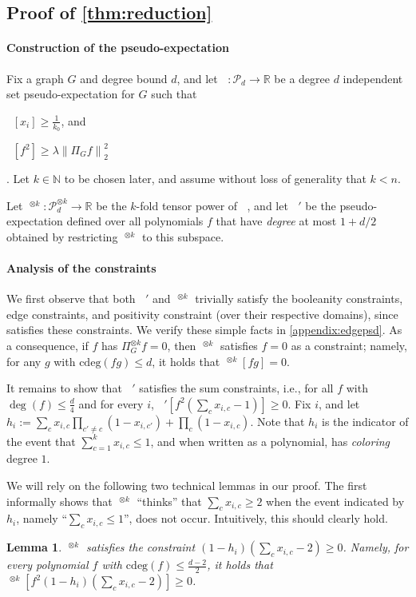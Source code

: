 \documentclass[10pt,a4paper]{article}
\newtheorem{lemma}[theorem]{Lemma}
\theoremstyle{definition}
\newcommand{\parhead}[1]{\paragraph{#1}}
\newcommand{\N}{\mathbb N}
\newcommand{\R}{\mathbb R}
\newcommand{\cP}{\mathcal P}
\DeclareMathOperator{\pE}{\tilde{\mathbb{E}}}
\def\norm#1{\left\| #1 \right\|}
\newcommand{\cdeg}{\mathrm{cdeg}}
\newcommand{\numcolors}{k}
\newcommand{\numlb}{k_0}
\begin{document}
\subsection{Proof of \cref{thm:reduction}}
\parhead{Construction of the pseudo-expectation}
Fix a graph $G$ and degree bound $d$, and let $\pE \colon \cP_d \to \R$ be a degree $d$ independent set pseudo-expectation for $G$ such that \begin{inparaenum}[(1)] \item $\pE[x_i] \geq \frac{1}{\numlb}$, and \item $\pE[f^2] \geq \lambda \norm{\Pi_G f}_2^2$\end{inparaenum}. Let $\numcolors \in \N$ to be chosen later, and assume without loss of generality that $\numcolors < n$.  

Let $\pE^{\otimes \numcolors} \colon \cP_d^{\otimes \numcolors} \to \R$ be the $\numcolors$-fold tensor power of $\pE$, and let $\pE'$ be the pseudo-expectation defined over all polynomials $f$ that have \emph{degree} at most $1 + d/2$ obtained by restricting $\pE^{\otimes \numcolors}$ to this subspace. 

\parhead{Analysis of the constraints} 
We first observe that both $\pE'$ and $\pE^{\otimes \numcolors}$ trivially satisfy the booleanity constraints, edge constraints, and positivity constraint (over their respective domains), since $\pE$ satisfies these constraints. We verify these simple facts in \cref{appendix:edgepsd}. As a consequence, if $f$ has $\Pi_G^{\otimes \numcolors} f = 0$, then $\pE^{\otimes \numcolors}$ satisfies $f = 0$ as a constraint; namely, for any $g$ with $\cdeg(f g) \leq d$, it holds that $\pE^{\otimes \numcolors}[f g] = 0$.

It remains to show that $\pE'$ satisfies the sum constraints, i.e., for all $f$ with $\deg(f) \leq \frac{d}{4}$ and for every $i$, $\pE'[f^2 (\sum_c x_{i,c} - 1)] \geq 0$. Fix $i$, and let $h_i := \sum_{c} x_{i,c} \prod_{c' \ne c} (1 - x_{i,c'}) + \prod_{c} (1 - x_{i,c})$. Note that $h_i$ is the indicator of the event that $\sum_{c = 1}^\numcolors x_{i,c} \leq 1$, and when written as a polynomial, has \emph{coloring} degree $1$.

We will rely on the following two technical lemmas in our proof. The first informally shows that $\pE^{\otimes \numcolors}$ ``thinks'' that $\sum_c x_{i,c} \geq 2$ when the event indicated by $h_i$, namely ``$\sum_c x_{i,c} \leq 1$'', does not occur. Intuitively, this should clearly hold.
\begin{lemma}
\label{claim:indicatorsos}
$\pE^{\otimes \numcolors}$ satisfies the constraint $(1 - h_i) (\sum_{c} x_{i,c} - 2) \geq 0$. Namely, for every polynomial $f$ with $\cdeg(f) \leq \frac{d-2}{2}$, it holds that $\pE^{\otimes \numcolors}[f^2 (1 - h_i) (\sum_c x_{i,c} - 2)] \geq 0$.
\end{lemma}
\end{document}
